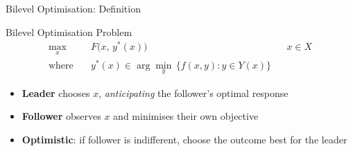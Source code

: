 \documentclass[fleqn,11pt,aspectratio=43]{beamer}
\begin{document}
\begin{frame}[shrink=5]{Bilevel Optimisation: Definition}
  \begin{block}{Bilevel Optimisation Problem}
    \vspace{-0.3em}
    \begin{align*}
      \max_{x}\quad & F\bigl(x,\,y^*(x)\bigr) & &x\in X\\
      \text{where}\quad & y^*(x)\in\arg\min_{y}\,\{f(x,y):y\in Y(x)\}
    \end{align*}
    \vspace{-0.4em}
  \end{block}
  \begin{itemize}
    \item \textbf{Leader} chooses $x$, \emph{anticipating} the follower's optimal response
    \item \textbf{Follower} observes $x$ and minimises their own objective
    \item \textbf{Optimistic}: if follower is indifferent, choose the outcome best for the leader
  \end{itemize}
\end{frame}
\end{document}
